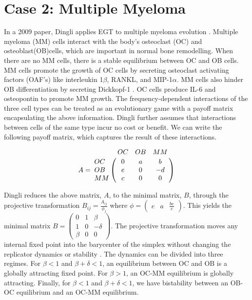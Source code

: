 \documentclass[12pt]{report}
\begin{document}
\section*{Case 2: Multiple Myeloma}
In a 2009 paper, Dingli applies EGT to multiple myeloma evolution \cite{Dingli2009}. Multiple myeloma (MM) cells interact with the body's osteoclast (OC) and osteoblast(OB)cells, which are important in normal bone remodelling. When there are no MM cells, there is a stable equilibrium between OC and OB cells. MM cells promote the growth of OC cells by secreting osteoclast activating factors (OAF's) like interleukin  1$\beta$, RANKL, and MIP-1$\alpha$. MM cells also hinder OB differentiation by secreting Dickkopf-1 \cite{Dingli2009}. OC cells produce IL-6 and osteopontin to promote MM growth. The frequency-dependent interactions of the three cell types can be treated as an evolutionary game with a payoff matrix encapsulating the above information. Dingli further assumes that interactions between cells of the same type incur no cost or benefit. We can write the following payoff matrix, which captures the result of these interactions. 

$$A = \bordermatrix{\text{}&OC&OB&MM\cr
                OC& 0 & a& b \cr
                OB& e  &  0 & -d \cr
                MM& c & 0 & 0 \cr
               }$$

Dingli reduces the above matrix, $A$, to the minimal matrix, $B$, through the projective transformation $B_{ij} = \frac{A_{ij}}{\phi_j}$ where 
$\phi = {\begin{pmatrix} e & a & \frac{be}{c} \end{pmatrix}}$.
This yields the minimal matrix
$B = {\begin{pmatrix}
0 & 1 & \beta \\
1 & 0 & -\delta \\
\beta & 0 & 0
\end{pmatrix}}$. 
The projective transformation moves any internal fixed point into the barycenter of the simplex without changing the replicator dynamics or stability \cite{Hofbauer1998}. The dynamics can be divided into three regimes. For $\beta < 1$ and $\beta + \delta < 1$, an equilibrium between OC and OB is a globally attracting fixed point. For $\beta > 1$, an OC-MM equilibrium is globally attracting. Finally, for $\beta < 1$ and $\beta + \delta < 1$, we have bistability between an OB-OC equilibrium and an OC-MM equilibrium. 
\end{document}
